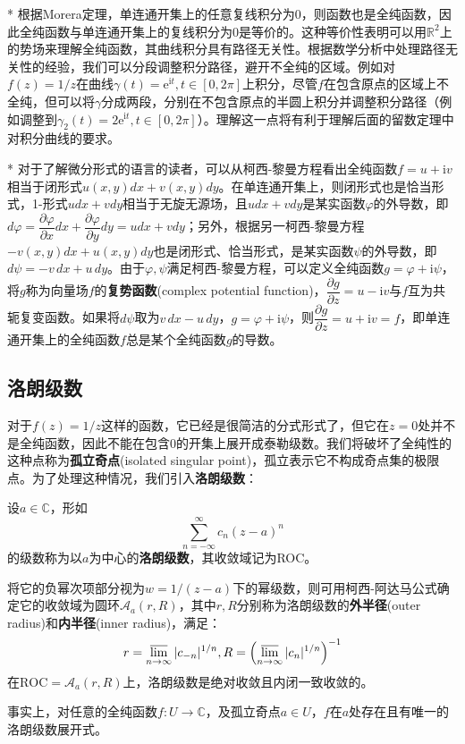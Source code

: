 \documentclass{ctexbook}
\begin{document}
\begin{remark}*
    根据Morera定理，单连通开集上的任意复线积分为0，则函数也是全纯函数，因此全纯函数与单连通开集上的复线积分为0是等价的。这种等价性表明可以用$\mathbb{R}^2$上的势场来理解全纯函数，其曲线积分具有路径无关性。根据数学分析中处理路径无关性的经验，我们可以分段调整积分路径，避开不全纯的区域。例如对$f(z)=1/z$在曲线$\gamma(t)=\mathrm{e}^{\mathrm{i}t},t\in[0,2\pi]$上积分，尽管$f$在包含原点的区域上不全纯，但可以将$\gamma$分成两段，分别在不包含原点的半圆上积分并调整积分路径（例如调整到$\gamma_2(t)=2\mathrm{e}^{\mathrm{i}t},t\in[0,2\pi]$）。理解这一点将有利于理解后面的留数定理中对积分曲线的要求。
\end{remark}

\begin{remark}*
    对于了解微分形式的语言的读者，可以从柯西-黎曼方程看出全纯函数$f=u+\mathrm{i}v$相当于闭形式$u(x,y)dx+v(x,y)dy$。在单连通开集上，则闭形式也是恰当形式，1-形式$udx+vdy$相当于无旋无源场，且$udx+vdy$是某实函数$\varphi$的外导数，即$d\varphi=\dfrac{\partial \varphi}{\partial x}dx+\dfrac{\partial \varphi}{\partial y}dy=udx+vdy$；另外，根据另一柯西-黎曼方程$-v(x,y)dx+u(x,y)dy$也是闭形式、恰当形式，是某实函数$\psi$的外导数，即$d\psi=-v\,dx+u\,dy$。由于$\varphi,\psi$满足柯西-黎曼方程，可以定义全纯函数$g=\varphi+\mathrm{i}\psi$，将$g$称为向量场$f$的\textbf{复势函数}(complex potential function)，$\dfrac{\partial g}{\partial z}=u-\mathrm{i}v$与$f$互为共轭复变函数。如果将$d\psi$取为$v\,dx-u\,dy$，$g=\varphi+\mathrm{i}\psi$，则$\dfrac{\partial g}{\partial z}=u+\mathrm{i}v=f$，即单连通开集上的全纯函数$f$总是某个全纯函数$g$的导数。
\end{remark}

\subsection{洛朗级数}\label{sub:laurant_series}
对于$f(z)=1/z$这样的函数，它已经是很简洁的分式形式了，但它在$z=0$处并不是全纯函数，因此不能在包含0的开集上展开成泰勒级数。我们将破坏了全纯性的这种点称为\textbf{孤立奇点}(isolated singular point)，孤立表示它不构成奇点集的极限点。为了处理这种情况，我们引入\textbf{洛朗级数}：

\begin{definition}[洛朗级数]
    设$a\in\mathbb{C}$，形如
    \[\sum_{n=-\infty}^{\infty}c_n(z-a)^n\]
    的级数称为以$a$为中心的\textbf{洛朗级数}，其收敛域记为ROC。

    将它的负幂次项部分视为$w=1/(z-a)$下的幂级数，则可用柯西-阿达马公式确定它的收敛域为圆环$\mathcal{A} _a(r,R)$，其中$r,R$分别称为洛朗级数的\textbf{外半径}(outer radius)和\textbf{内半径}(inner radius)，满足：
    \[r=\varlimsup_{n\to\infty}|c_{-n}|^{1/n},R=\left(\varlimsup_{n\to\infty}|c_n|^{1/n}\right)^{-1}\]
    在$\text{ROC}=\mathcal{A} _a(r,R)$上，洛朗级数是绝对收敛且内闭一致收敛的。
\end{definition}
事实上，对任意的全纯函数$f:U\to\mathbb{C}$，及孤立奇点$a\in U$，$f$在$a$处存在且有唯一的洛朗级数展开式。
\end{document}

